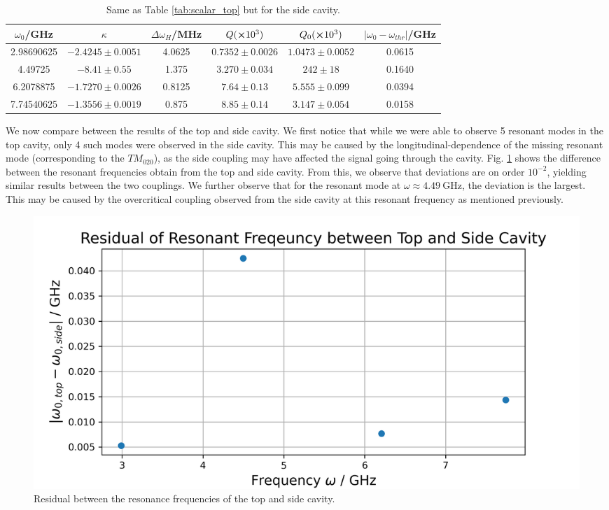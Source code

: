 \documentclass[a4paper]{report}
\numberwithin{equation}{section}
\begin{document}
\begin{table}[h!]
	\centering
	\begin{tabular}{|c|c|c|c|c|c|}
		\hline $\omega_0$/GHz & $\kappa$ & $\Delta\omega_H$/MHz & $Q (\cross 10^3)$ & $Q_0 (\cross 10^3)$ & $\left| \omega_0 - \omega_{thr} \right|$/GHz \\ 
		\hline 2.98690625 & $-2.4245 \pm 0.0051$ & 4.0625 & $0.7352 \pm 0.0026$ & $1.0473 \pm 0.0052$ & 0.0615 \\ 
		\hline 4.49725 & $-8.41 \pm 0.55$ & 1.375 & $3.270 \pm 0.034$ & $242 \pm 18$ & 0.1640 \\
		\hline 6.2078875  & $ -1.7270 \pm 0.0026$ & 0.8125 & $7.64 \pm 0.13$ & $5.555 \pm 0.099$ & 0.0394 \\
		\hline 7.74540625  & $-1.3556 \pm 0.0019$ & 0.875 & $8.85 \pm 0.14$ & $3.147 \pm 0.054$ & 0.0158 \\ 
		\hline
	\end{tabular}
	
	\caption{Same as Table \ref{tab:scalar_top} but for the side cavity. }
	\label{tab:scalar_side}
\end{table}

We now compare between the results of the top and side cavity. We first notice that while we were able to observe 5 resonant modes in the top cavity, only 4 such modes
were observed in the side cavity. This may be caused by the longitudinal-dependence of the missing resonant mode (corresponding to the $TM_{020}$), as the side coupling
may have affected the signal going through the cavity. Fig. \ref{fig:scalar_residual} shows the difference between the resonant frequencies obtain from the top and side cavity.
From this, we observe that deviations are on order $10^{-2}$, yielding similar results between the two couplings. We further observe that for the resonant mode at 
$\omega \approx \SI{4.49}{\giga\hertz}$, the deviation is the largest. This may be caused by the overcritical coupling observed from the side cavity at this resonant frequency
as mentioned previously.\par 


\begin{figure}[h!]
	\centering
	\includegraphics[width=0.6\columnwidth]{scalar_residual_topside.png}
	\caption{Residual between the resonance frequencies of the top and side cavity. }

	\label{fig:scalar_residual}
\end{figure}
\end{document}
